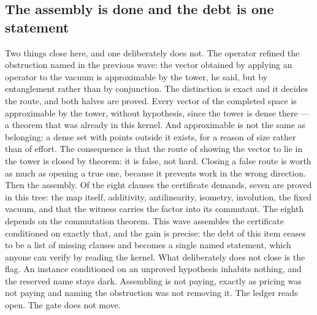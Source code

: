\documentclass[11pt]{article}
\theoremstyle{definition}\newtheorem{deriv}{Derivation}
\begin{document}
\subsection*{The assembly is done and the debt is one statement}Two things close here, and one deliberately does not. The operator refined the obstruction named in the previous wave: the vector obtained by applying an operator to the vacuum is approximable by the tower, he said, but by entanglement rather than by conjunction. The distinction is exact and it decides the route, and both halves are proved. Every vector of the completed space is approximable by the tower, without hypothesis, since the tower is dense there --- a theorem that was already in this kernel. And approximable is not the same as belonging: a dense set with points outside it exists, for a reason of size rather than of effort. The consequence is that the route of showing the vector to lie in the tower is closed by theorem: it is false, not hard. Closing a false route is worth as much as opening a true one, because it prevents work in the wrong direction. Then the assembly. Of the eight clauses the certificate demands, seven are proved in this tree: the map itself, additivity, antilinearity, isometry, involution, the fixed vacuum, and that the witness carries the factor into its commutant. The eighth depends on the commutation theorem. This wave assembles the certificate conditioned on exactly that, and the gain is precise: the debt of this item ceases to be a list of missing clauses and becomes a single named statement, which anyone can verify by reading the kernel. What deliberately does not close is the flag. An instance conditioned on an unproved hypothesis inhabits nothing, and the reserved name stays dark. Assembling is not paying, exactly as pricing was not paying and naming the obstruction was not removing it. The ledger reads open. The gate does not move.
\end{document}
